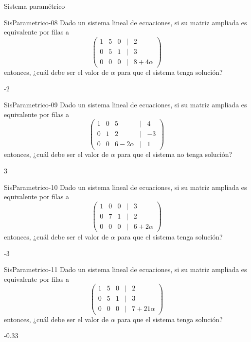 \documentclass[a4,11pt]{aleph-notas}
\begin{document}
\begin{quiz}{Sistema paramétrico}
\begin{numerical}[tolerance=0.01]%
    {SisParametrico-08}
    Dado un sistema lineal de ecuaciones, si su matriz ampliada es equivalente por filas a 
    \[
    \begin{pmatrix}
    1 & 5 & 0 & | & 2 \\
    0 & 5 & 1 & | & 3 \\
    0 & 0 & 0 & | & 8+4\alpha
    \end{pmatrix}
    \]
    entonces, ¿cuál debe ser el valor de $\alpha$ para que el sistema tenga solución?
    \item -2
\end{numerical}

\begin{numerical}[tolerance=0.01]%
    {SisParametrico-09}
    Dado un sistema lineal de ecuaciones, si su matriz ampliada es equivalente por filas a 
    \[
    \begin{pmatrix}
    1 & 0 & 5 & | & 4 \\
    0 & 1 & 2 & | & -3 \\
    0 & 0 & 6-2\alpha & | & 1
    \end{pmatrix}
    \]
    entonces, ¿cuál debe ser el valor de $\alpha$ para que el sistema no tenga solución?
    \item 3
\end{numerical}

\begin{numerical}[tolerance=0.01]%
    {SisParametrico-10}
    Dado un sistema lineal de ecuaciones, si su matriz ampliada es equivalente por filas a 
    \[
    \begin{pmatrix}
    1 & 0 & 0 & | & 3 \\
    0 & 7 & 1 & | & 2 \\
    0 & 0 & 0 & | & 6+2\alpha
    \end{pmatrix}
    \]
    entonces, ¿cuál debe ser el valor de $\alpha$ para que el sistema tenga solución?
    \item -3
\end{numerical}

\begin{numerical}[tolerance=0.01]%
    {SisParametrico-11}
    Dado un sistema lineal de ecuaciones, si su matriz ampliada es equivalente por filas a 
    \[
    \begin{pmatrix}
    1 & 5 & 0 & | & 2 \\
    0 & 5 & 1 & | & 3 \\
    0 & 0 & 0 & | & 7+21\alpha
    \end{pmatrix}
    \]
    entonces, ¿cuál debe ser el valor de $\alpha$ para que el sistema tenga solución?
    \item -0.33
\end{numerical}


\end{quiz}
\end{document}
